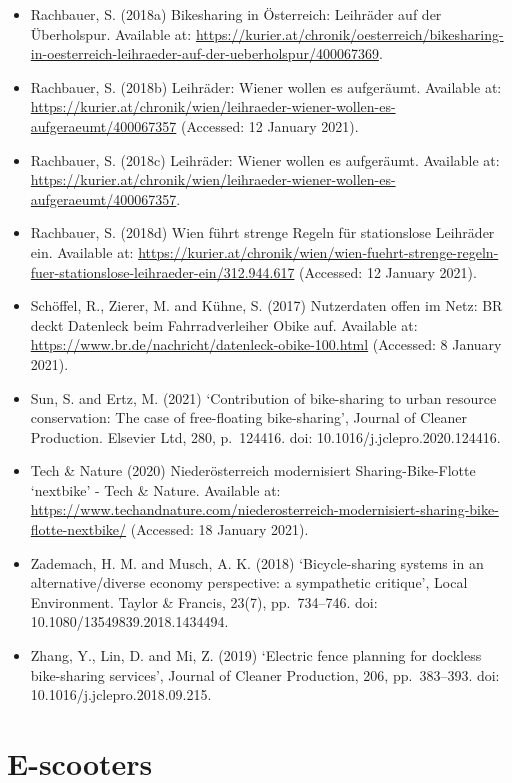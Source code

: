 \documentclass[
]{book}
\begin{document}
\begin{itemize}
\item
  Rachbauer, S. (2018a) Bikesharing in Österreich: Leihräder auf der Überholspur. Available at: \url{https://kurier.at/chronik/oesterreich/bikesharing-in-oesterreich-leihraeder-auf-der-ueberholspur/400067369}.
\item
  Rachbauer, S. (2018b) Leihräder: Wiener wollen es aufgeräumt. Available at: \url{https://kurier.at/chronik/wien/leihraeder-wiener-wollen-es-aufgeraeumt/400067357} (Accessed: 12 January 2021).
\item
  Rachbauer, S. (2018c) Leihräder: Wiener wollen es aufgeräumt. Available at: \url{https://kurier.at/chronik/wien/leihraeder-wiener-wollen-es-aufgeraeumt/400067357}.
\item
  Rachbauer, S. (2018d) Wien führt strenge Regeln für stationslose Leihräder ein. Available at: \url{https://kurier.at/chronik/wien/wien-fuehrt-strenge-regeln-fuer-stationslose-leihraeder-ein/312.944.617} (Accessed: 12 January 2021).
\item
  Schöffel, R., Zierer, M. and Kühne, S. (2017) Nutzerdaten offen im Netz: BR deckt Datenleck beim Fahrradverleiher Obike auf. Available at: \url{https://www.br.de/nachricht/datenleck-obike-100.html} (Accessed: 8 January 2021).
\item
  Sun, S. and Ertz, M. (2021) `Contribution of bike-sharing to urban resource conservation: The case of free-floating bike-sharing', Journal of Cleaner Production. Elsevier Ltd, 280, p.~124416. doi: 10.1016/j.jclepro.2020.124416.
\item
  Tech \& Nature (2020) Niederösterreich modernisiert Sharing-Bike-Flotte `nextbike' - Tech \& Nature. Available at: \url{https://www.techandnature.com/niederosterreich-modernisiert-sharing-bike-flotte-nextbike/} (Accessed: 18 January 2021).
\item
  Zademach, H. M. and Musch, A. K. (2018) `Bicycle-sharing systems in an alternative/diverse economy perspective: a sympathetic critique', Local Environment. Taylor \& Francis, 23(7), pp.~734--746. doi: 10.1080/13549839.2018.1434494.
\item
  Zhang, Y., Lin, D. and Mi, Z. (2019) `Electric fence planning for dockless bike-sharing services', Journal of Cleaner Production, 206, pp.~383--393. doi: 10.1016/j.jclepro.2018.09.215.
\end{itemize}

\hypertarget{e-scooters}{%
\section{E-scooters}\label{e-scooters}}
\end{document}
